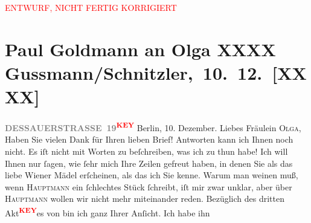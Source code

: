 
\begin{center}
            \textcolor{red}{ENTWURF, NICHT FERTIG KORRIGIERT}
                      \end{center}
            
         
         \renewcommand{\erwaehntePersonen}{Personen: Gerhart Hauptmann, Olga Schnitzler}
         \renewcommand{\erwaehnteOrte}{Orte: Berlin, Wien}
         \renewcommand{\erwaehnteWerke}{}
               \section[ Paul Goldmann an Olga XXXX Gussmann/Schnitzler, 10. 12. {[}XXXX{]}]{ Paul Goldmann an Olga XXXX Gussmann/Schnitzler, 10. 12. {[}XXXX{]}}\nopagebreak{}\rehead{ }\begin{ledgroupsized}[t]{13cm}\normalsize\beginnumbering \toendnotes[C]{\smallbreak\pagebreak[2]} 
\toendnotes[C]{\smallbreak}\pstart
           \noindent{}{\pb}\pend
           \textcolor{gray}{\textbf{DESSAUERSTRASSE 19}}\textcolor{red}{\textsuperscript{\textbf{KEY}}}\pstart
           Berlin, 10. Dezember.\pend
           \pstart{}Liebes Fräulein \textsc{Olga},\pend\pstart
           Haben Sie vielen Dank für Ihren lieben Brief! Antworten kann ich Ihnen noch nicht. Es
               iſt nicht mit Worten zu beſchreiben, was ich zu thun habe! Ich will Ihnen nur ſagen,
               wie ſehr mich Ihre Zeilen gefreut  haben, in denen Sie als das liebe Wiener
               Mädel erſcheinen, als das ich Sie kenne. Warum man weinen muß, wenn \textsc{Hauptmann} ein ſchlechtes Stück ſchreibt, iſt mir {\pb} zwar unklar, aber über \textsc{Hauptmann} wollen wir nicht mehr miteinander reden. Bezüglich des dritten Akt\textcolor{red}{\textsuperscript{\textbf{KEY}}}es von \label{XXXXv}\label{XXXX} bin ich ganz Ihrer Anſicht. Ich habe ihn

\end{ledgroupsized}
